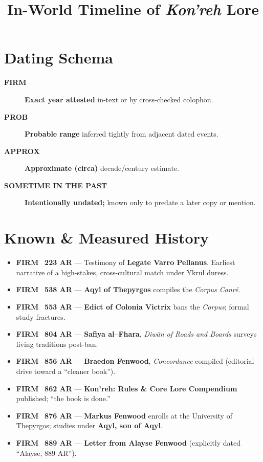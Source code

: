 \documentclass[11pt]{article}
\title{In-World Timeline of \emph{Kon'reh} Lore}
\author{}
\date{}
\newcommand{\badge}[3]{%
  {\setlength{\fboxsep}{2pt}\colorbox{#1}{\textcolor{#2}{\sffamily\footnotesize\textbf{#3}}}}%
}
\newcommand{\firm}{\badge{firmbg}{firmfg}{FIRM}}
\newcommand{\prob}{\badge{probbg}{probfg}{PROB}}
\newcommand{\appx}{\badge{appxbg}{appxfg}{APPROX}}
\newcommand{\past}{\badge{pastbg}{pastfg}{SOMETIME IN THE PAST}}
\begin{document}
\section*{Dating Schema}
\begin{description}
  \item[\firm] \textbf{Exact year attested} in-text or by cross-checked colophon.
  \item[\prob] \textbf{Probable range} inferred tightly from adjacent dated events.
  \item[\appx] \textbf{Approximate (circa)} decade/century estimate.
  \item[\past] \textbf{Intentionally undated;} known only to predate a later copy or mention.
\end{description}

\section*{Known \& Measured History}
\begin{itemize}
  \item \firm\ \textbf{223 AR} --- Testimony of \textbf{Legate Varro Pellanus}. Earliest narrative of a high-stakes, cross-cultural match under Ykrul duress.
  \item \firm\ \textbf{538 AR} --- \textbf{Aqyl of Thepyrgos} compiles the \emph{Corpus Canré}.
  \item \firm\ \textbf{553 AR} --- \textbf{Edict of Colonia Victrix} bans the \emph{Corpus}; formal study fractures.
  \item \firm\ \textbf{804 AR} --- \textbf{Safiya al--Fhara}, \emph{Diwān of Roads and Boards} surveys living traditions post-ban.
  \item \firm\ \textbf{856 AR} --- \textbf{Braedon Fenwood}, \emph{Concordance} compiled (editorial drive toward a ``cleaner book'').
  \item \firm\ \textbf{862 AR} --- \textbf{Kon'reh: Rules \& Core Lore Compendium} published; ``the book is done.''
  \item \firm\ \textbf{876 AR} --- \textbf{Markus Fenwood} enrolls at the University of Thepyrgos; studies under \textbf{Aqyl, son of Aqyl}.
  \item \firm\ \textbf{889 AR} --- \textbf{Letter from Alayse Fenwood} (explicitly dated ``Alayse, 889 AR'').
\end{itemize}
\end{document}
